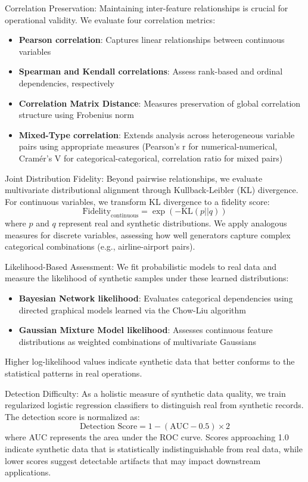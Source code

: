 \documentclass[conference]{IEEEtran}
\begin{document}
Correlation Preservation:
Maintaining inter-feature relationships is crucial for operational validity. We evaluate four correlation metrics:
\begin{itemize}
    \item \textbf{Pearson correlation}: Captures linear relationships between continuous variables
    \item \textbf{Spearman and Kendall correlations}: Assess rank-based and ordinal dependencies, respectively
    \item \textbf{Correlation Matrix Distance}: Measures preservation of global correlation structure using Frobenius norm
    \item \textbf{Mixed-Type correlation}: Extends analysis across heterogeneous variable pairs using appropriate measures (Pearson's r for numerical-numerical, Cramér's V for categorical-categorical, correlation ratio for mixed pairs)
\end{itemize}

Joint Distribution Fidelity:
Beyond pairwise relationships, we evaluate multivariate distributional alignment through Kullback-Leibler (KL) divergence. For continuous variables, we transform KL divergence to a fidelity score:
\begin{equation}
\text{Fidelity}_{\text{continuous}} = \exp(-\text{KL}(p||q))
\end{equation}
where $p$ and $q$ represent real and synthetic distributions. We apply analogous measures for discrete variables, assessing how well generators capture complex categorical combinations (e.g., airline-airport pairs).

Likelihood-Based Assessment:
We fit probabilistic models to real data and measure the likelihood of synthetic samples under these learned distributions:
\begin{itemize}
    \item \textbf{Bayesian Network likelihood}: Evaluates categorical dependencies using directed graphical models learned via the Chow-Liu algorithm
    \item \textbf{Gaussian Mixture Model likelihood}: Assesses continuous feature distributions as weighted combinations of multivariate Gaussians
\end{itemize}
Higher log-likelihood values indicate synthetic data that better conforms to the statistical patterns in real operations.

Detection Difficulty:
As a holistic measure of synthetic data quality, we train regularized logistic regression classifiers to distinguish real from synthetic records. The detection score is normalized as:
\begin{equation}
\text{Detection Score} = 1 - (\text{AUC} - 0.5) \times 2
\end{equation}
where AUC represents the area under the ROC curve. Scores approaching 1.0 indicate synthetic data that is statistically indistinguishable from real data, while lower scores suggest detectable artifacts that may impact downstream applications.
\end{document}
